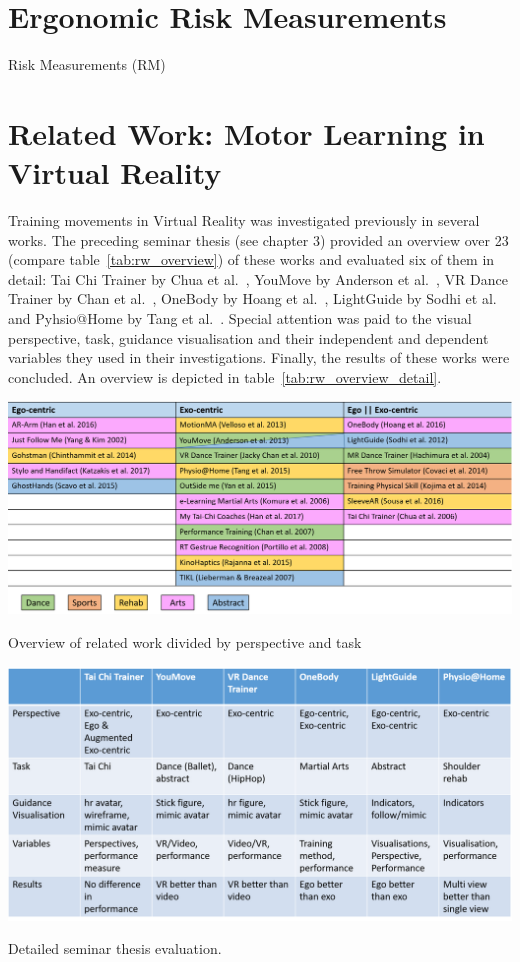 \section{Ergonomic Risk Measurements}
\label{section:rm}
Risk Measurements (RM)

\section{Related Work: Motor Learning in Virtual Reality}
\label{section:related_work}
Training movements in Virtual Reality was investigated previously in several works. The preceding seminar thesis (see chapter 3) provided an overview over 23 (compare table~\ref{tab:rw_overview}) of these works and evaluated six of them in detail: Tai Chi Trainer by Chua et al.~\cite{thaichichua}, YouMove by Anderson et al.~\cite{YouMove}, VR Dance Trainer by Chan et al.~\cite{vrdancetrainer}, OneBody by Hoang et al.~\cite{onebody}, LightGuide by Sodhi et al.~\cite{lightguide} and Pyhsio@Home by Tang et al.~\cite{physioathome}. Special attention was paid to the visual perspective, task, guidance visualisation and their independent and dependent variables they used in their investigations. Finally, the results of these works were concluded. An overview is depicted in table~\ref{tab:rw_overview_detail}.
\begin{table}[htb]
	\centering
	\includegraphics[width=\textwidth]{figures/rw_overview.png}
	\caption[Overview seminar evaluation]{Overview of related work divided by perspective and task}
	\label{tab:rw_overview}
\end{table}
\begin{table}[htb]
	\centering
	\includegraphics[width=\textwidth]{figures/detail_paper_overview.png}
	\caption[Detailed analysis of related work in seminar thesis.]{Detailed seminar thesis evaluation.}
	\label{tab:rw_overview_detail}
\end{table}
